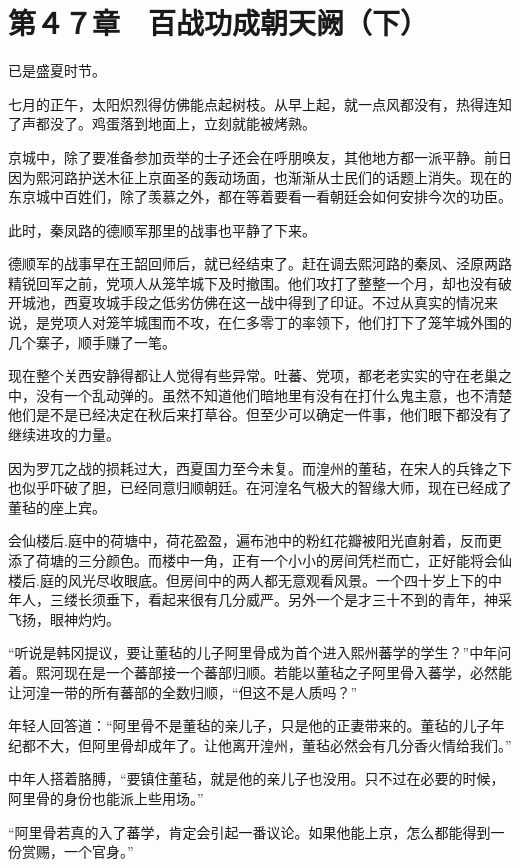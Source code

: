 \section{第４７章　百战功成朝天阙（下）}

已是盛夏时节。

七月的正午，太阳炽烈得仿佛能点起树枝。从早上起，就一点风都没有，热得连知了声都没了。鸡蛋落到地面上，立刻就能被烤熟。

京城中，除了要准备参加贡举的士子还会在呼朋唤友，其他地方都一派平静。前日因为熙河路护送木征上京面圣的轰动场面，也渐渐从士民们的话题上消失。现在的东京城中百姓们，除了羡慕之外，都在等着要看一看朝廷会如何安排今次的功臣。

此时，秦凤路的德顺军那里的战事也平静了下来。

德顺军的战事早在王韶回师后，就已经结束了。赶在调去熙河路的秦凤、泾原两路精锐回军之前，党项人从笼竿城下及时撤围。他们攻打了整整一个月，却也没有破开城池，西夏攻城手段之低劣仿佛在这一战中得到了印证。不过从真实的情况来说，是党项人对笼竿城围而不攻，在仁多零丁的率领下，他们打下了笼竿城外围的几个寨子，顺手赚了一笔。

现在整个关西安静得都让人觉得有些异常。吐蕃、党项，都老老实实的守在老巢之中，没有一个乱动弹的。虽然不知道他们暗地里有没有在打什么鬼主意，也不清楚他们是不是已经决定在秋后来打草谷。但至少可以确定一件事，他们眼下都没有了继续进攻的力量。

因为罗兀之战的损耗过大，西夏国力至今未复。而湟州的董毡，在宋人的兵锋之下也似乎吓破了胆，已经同意归顺朝廷。在河湟名气极大的智缘大师，现在已经成了董毡的座上宾。

会仙楼后.庭中的荷塘中，荷花盈盈，遍布池中的粉红花瓣被阳光直射着，反而更添了荷塘的三分颜色。而楼中一角，正有一个小小的房间凭栏而亡，正好能将会仙楼后.庭的风光尽收眼底。但房间中的两人都无意观看风景。一个四十岁上下的中年人，三缕长须垂下，看起来很有几分威严。另外一个是才三十不到的青年，神采飞扬，眼神灼灼。

“听说是韩冈提议，要让董毡的儿子阿里骨成为首个进入熙州蕃学的学生？”中年问着。熙河现在是一个蕃部接一个蕃部归顺。若能以董毡之子阿里骨入蕃学，必然能让河湟一带的所有蕃部的全数归顺，“但这不是人质吗？”

年轻人回答道：“阿里骨不是董毡的亲儿子，只是他的正妻带来的。董毡的儿子年纪都不大，但阿里骨却成年了。让他离开湟州，董毡必然会有几分香火情给我们。”

中年人搭着胳膊，“要镇住董毡，就是他的亲儿子也没用。只不过在必要的时候，阿里骨的身份也能派上些用场。”

“阿里骨若真的入了蕃学，肯定会引起一番议论。如果他能上京，怎么都能得到一份赏赐，一个官身。”

